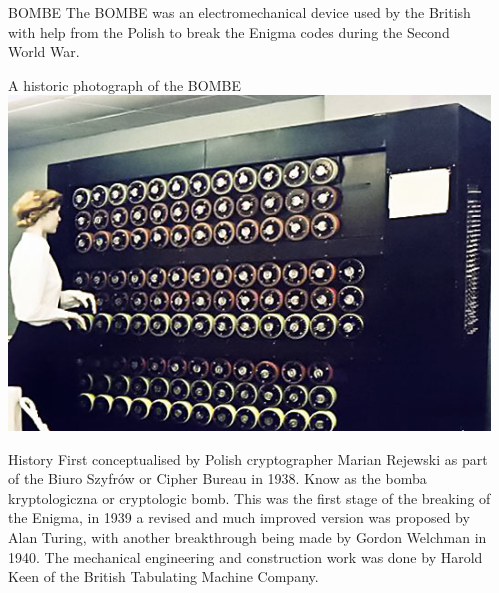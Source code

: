 \documentclass[final]{beamer}
\begin{document}
\begin{frame}{}
\begin{columns}[t]
\begin{column}{.32\linewidth}
      \end{column}


      \begin{column}{.32\linewidth}
      \centering
       \begin{block}{BOMBE}
          The BOMBE was an electromechanical device used by the British with help from the Polish to break the Enigma codes during the Second World War.
        \end{block}
        
        \begin{block}{A historic photograph of the BOMBE}
          \includegraphics[width=\columnwidth]{historicBOMBE.png} 
        \end{block}
        
        \begin{block}{History} \small{
		First conceptualised by Polish cryptographer Marian Rejewski as part of the Biuro Szyfr\'ow or Cipher Bureau in 1938. Know as the bomba kryptologiczna or cryptologic bomb. This was the first stage of the breaking of the Enigma, in 1939 a revised and much improved version was proposed by Alan Turing, with another breakthrough being made by Gordon Welchman in 1940. The mechanical engineering and construction work was done by Harold Keen of the British Tabulating Machine Company.}
        \end{block}
        

\end{column}
\end{columns}
\end{frame}
\end{document}

